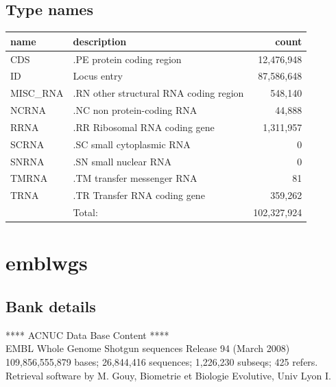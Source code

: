 \documentclass{article}
\begin{document}
\begin{Schunk}
\subsection{Type names}
\noindent\begin{tabular}{llr}
\hline \hline
name & description & count \\
\hline
CDS  &  .PE protein coding region  &  12,476,948 \\
ID  &  Locus entry  &  87,586,648 \\
MISC\_RNA  &  .RN other structural RNA coding region  &  548,140 \\
NCRNA  &  .NC non protein-coding RNA  &  44,888 \\
RRNA  &  .RR Ribosomal RNA coding gene  &  1,311,957 \\
SCRNA  &  .SC small cytoplasmic RNA  &  0 \\
SNRNA  &  .SN small nuclear RNA  &  0 \\
TMRNA  &  .TM transfer messenger RNA  &  81 \\
TRNA  &  .TR Transfer RNA coding gene  &  359,262 \\
\hline
 & Total: & 102,327,924 \\
\hline \hline
\end{tabular}

\section{ emblwgs }
\subsection{Bank details}
             ****     ACNUC Data Base Content      ****                         \\
        EMBL Whole Genome Shotgun sequences Release 94  (March 2008)  \\
109,856,555,879 bases; 26,844,416 sequences; 1,226,230 subseqs; 425 refers.\\
Retrieval software by M. Gouy, Biometrie et Biologie Evolutive, Univ Lyon I. 


\end{Schunk}
\end{document}
